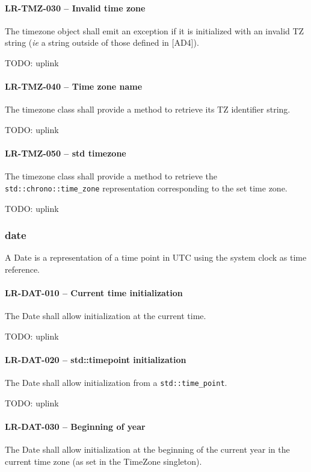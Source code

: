 \paragraph{LR-TMZ-030 -- Invalid time zone}
The timezone object shall emit an exception if it is initialized with
an invalid TZ string (\textit{ie} a string outside of those defined in [AD4]).

TODO: uplink
\paragraph{LR-TMZ-040 -- Time zone name}
The timezone class shall provide a method to retrieve its TZ identifier string.

TODO: uplink

\paragraph{LR-TMZ-050 -- std time\textunderscore zone}
The timezone class shall provide a method to retrieve the
\lstinline{std::chrono::time_zone} representation corresponding to the set
time zone.

TODO: uplink

\subsubsection{date}
A Date is a representation of a time point in UTC using the system clock
as time reference.

\paragraph{LR-DAT-010 -- Current time initialization}
The Date shall allow initialization at the current time.

TODO: uplink

\paragraph{LR-DAT-020 -- std::time\textunderscore point initialization}
The Date shall allow initialization from a \lstinline{std::time_point}.

TODO: uplink

\paragraph{LR-DAT-030 -- Beginning of year}
The Date shall allow initialization at the beginning of the current year
in the current time zone (as set in the TimeZone singleton).

